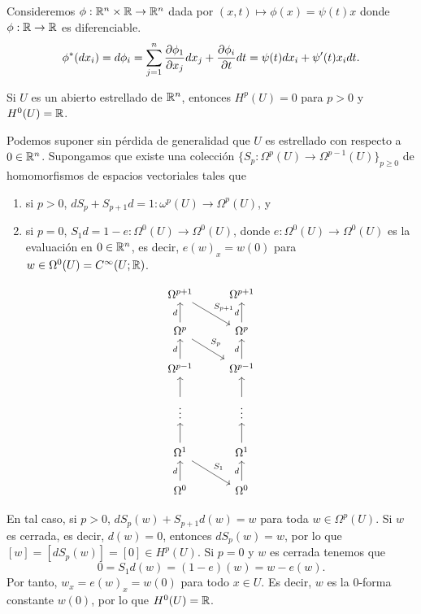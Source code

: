 \documentclass[CV.tex]{subfiles}
\begin{document}
\begin{ej}
Consideremos $\phi:\mathbb{R}^n\times\mathbb{R}\to\mathbb{R}^n$ dada por $(x,t)\mapsto\phi(x)=\psi(t)x$ donde $\phi:\mathbb{R}\to\mathbb{R}$ es diferenciable. 
\[
\phi^*(dx_i)=d\phi_i=\sum_{j=1}^n\frac{\partial \phi_1}{\partial x_j}dx_j+\frac{\partial \phi_i}{\partial t}dt=\psi(t)dx_i+\psi'(t)x_idt.
\]

\end{ej}

\begin{teorema}\label{poincare}
Si $U$ es un abierto estrellado de $\mathbb{R}^n$, entonces $H^p(U)=0$ para $p>0$ y $H^0(U)=\mathbb{R}$. 
\end{teorema}
\begin{dem}
Podemos suponer sin pérdida de generalidad que $U$ es estrellado con respecto a $0\in\mathbb{R}^n$. Supongamos que existe una colección $\{S_p:\Omega^p(U)\to \Omega^{p-1}(U)\}_{p\geq 0}$ de homomorfismos de espacios vectoriales tales que
\begin{enumerate}
\item si $p>0$, $dS_p+S_{p+1}d=1:\omega^p(U)\to\Omega^p(U)$, y
\item si $p=0$, $S_1d=1-e:\Omega^0(U)\to\Omega^0(U)$, donde $e:\Omega^0(U)\to\Omega^0(U)$ es la evaluación en $0\in\mathbb{R}^n$, es decir, $e(w)_x=w(0)$ para $w\in\Omega^0(U)=C^{\infty}(U;\mathbb{R})$.
\end{enumerate}
\[
\begin{tikzcd}
\Omega^{p+1}\arrow[dr, "S_{p+1}"]        & \Omega^{p+1}\\
\Omega^p\arrow[u, "d"] \arrow[dr, "S_p"] & \Omega^p\arrow[u, "d"]\\
\Omega^{p-1}\arrow[u,"d"]                & \Omega^{p-1}\arrow[u, "d"]\\
\vdots \arrow[u]                                   & \vdots\arrow[u]\\
        \Omega^1\arrow[dr, "S_1"]   \arrow[u]              & \Omega^1\arrow[u] \\
\Omega^0\arrow[u, "d"]                        & \Omega^0\arrow[u, "d"] 
\end{tikzcd}
\]

En tal caso, si $p>0$, $dS_p(w)+S_{p+1}d(w)=w$ para toda $w\in\Omega^p(U)$. Si $w$ es cerrada, es decir, $d(w)=0$, entonces $dS_p(w)=w$, por lo que $[w]=[dS_p(w)]=[0]\in H^p(U)$. Si $p=0$ y $w$ es cerrada tenemos que
\[
0=S_1d(w)=(1-e)(w)=w-e(w).
\]
Por tanto, $w_x=e(w)_x=w(0)$ para todo $x\in U$. Es decir, $w$ es la 0-forma constante $w(0)$, por lo que $H^0(U)=\mathbb{R}$. 


\end{dem}
\end{document}
